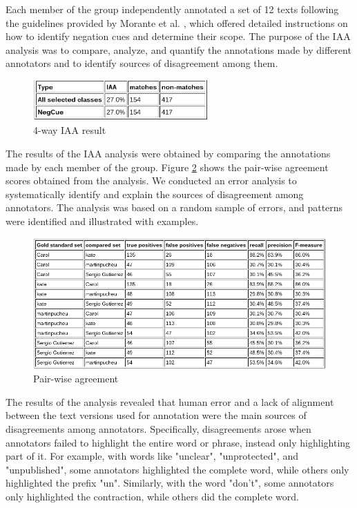 Each member of the group independently annotated a set of 12 texts following the guidelines provided by Morante et al. \cite{morante2011annotation}, which offered detailed instructions on how to identify negation cues and determine their scope. The purpose of the IAA analysis was to compare, analyze, and quantify the annotations made by different annotators and to identify sources of disagreement among them.

\begin{figure}[!h]
\begin{center}
  \includegraphics[width=0.6\textwidth]{Plots and results/4way.png}
  \caption{4-way IAA result}
  \label{fig:4way}
\end{center}  
\end{figure}

The results of the IAA analysis were obtained by comparing the annotations made by each member of the group. Figure \ref{fig:Pairwise agreement} shows the pair-wise agreement scores obtained from the analysis. We conducted an error analysis to systematically identify and explain the sources of disagreement among annotators. The analysis was based on a random sample of errors, and patterns were identified and illustrated with examples.

\begin{figure}[!h]
  \includegraphics[width=\linewidth]{Plots and results/pairwise.png}
  \caption{Pair-wise agreement}
  \label{fig:Pairwise agreement}
\end{figure}

The results of the analysis revealed that human error and a lack of alignment between the text versions used for annotation were the main sources of disagreements among annotators. Specifically, disagreements arose when annotators failed to highlight the entire word or phrase, instead only highlighting part of it. For example, with words like "unclear", "unprotected", and "unpublished", some annotators highlighted the complete word, while others only highlighted the prefix "un". Similarly, with the word "don't", some annotators only highlighted the contraction, while others did the complete word.

